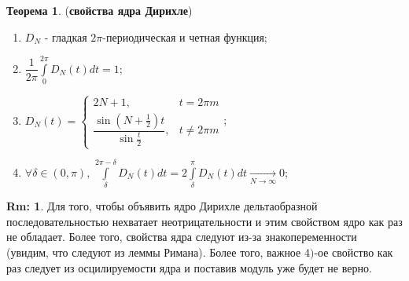 \documentclass[12pt]{article}
\theoremstyle{definition}
\newtheorem{rem}{Rm:}
\newtheorem{theorem}{Теорема}
\newcommand{\ddint}[2]{\displaystyle\int\limits_{#1}^{#2}}
\begin{document}
\begin{theorem}(\textbf{свойства ядра Дирихле})
	\begin{enumerate}[label=\arabic*)]
		\item $D_N$ - гладкая $2\pi$-периодическая и четная функция;
		\item $\dfrac{1}{2\pi}\ddint{0}{2\pi} D_N(t)dt = 1$;
		\item $D_N(t) = 
			\left\{
			\begin{array}{rl}
				2N + 1, & t = 2\pi m \\[5pt]
				\dfrac{\sin{(N + \frac{1}{2})t}}{\sin{\frac{t}{2}}}, & t \neq 2\pi m
			\end{array}\right.$;
		\item $\forall \delta \in (0,\pi), \, \ddint{\delta}{2\pi - \delta}D_N(t)dt = 2\ddint{\delta}{\pi}D_N(t)dt \xrightarrow[N \to \infty]{} 0$;
	\end{enumerate}
\end{theorem}
\begin{rem}
	Для того, чтобы объявить ядро Дирихле дельтаобразной последовательностью нехватает неотрицательности и этим свойством ядро как раз не обладает. Более того, свойства ядра следуют из-за знакопеременности (увидим, что следуют из леммы Римана). Более того, важное $4)$-ое свойство как раз следует из осцилируемости ядра и поставив модуль уже будет не верно.
\end{rem}
\newpage
\end{document}

